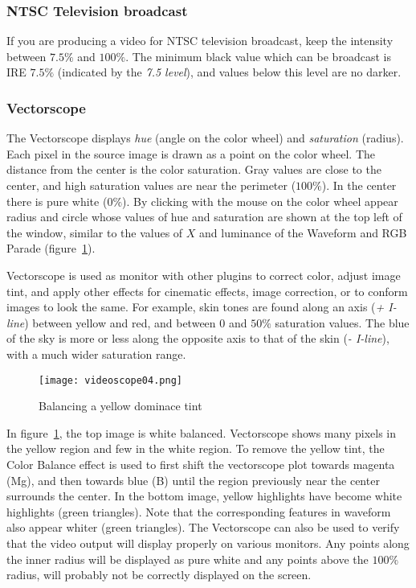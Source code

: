 \subsubsection*{NTSC Television broadcast}%
\label{ssub:ntsc_television_broadcast}

If you are producing a video for NTSC television broadcast, keep the intensity between $7.5\%$ and $100\%$. The minimum black value which can be broadcast is IRE $7.5\%$ (indicated by the \textit{7.5 level}), and values below this level are no darker.

\subsubsection*{Vectorscope}%
\label{ssub:Vectorscope}

The Vectorscope displays \textit{hue} (angle on the color wheel) and \textit{saturation} (radius). Each pixel in the source image is drawn as a point on the color wheel. The distance from the center is the color saturation. Gray values are close to the center, and high saturation values are near the perimeter ($100\%$). In the center there is pure white ($0\%$). By clicking with the mouse on the color wheel appear radius and circle whose values of hue and saturation are shown at the top left of the window, similar to the values of $X$ and luminance of the Waveform and RGB Parade (figure~\ref{fig:videoscope04}).

Vectorscope is used as monitor with other plugins to correct color, adjust image tint, and apply other effects for cinematic effects, image correction, or to conform images to look the same. For example, skin tones are found along an axis (\textit{+ I-line}) between yellow and red, and between $0$ and $50\%$ saturation values. The blue of the sky is more or less along the opposite axis to that of the skin (\textit{- I-line}), with a much wider saturation range.

\begin{figure}[hbtp]
    \centering
    \texttt{[image: videoscope04.png]}
    \caption{Balancing a yellow dominace tint}
    \label{fig:videoscope04}
\end{figure}

In figure~\ref{fig:videoscope04}, the top image is white balanced. Vectorscope shows many pixels in the yellow region and few in the white region. To remove the yellow tint, the Color Balance effect is used to first shift the vectorscope plot towards magenta (Mg), and then towards blue (B) until the region previously near the center surrounds the center. In the bottom image, yellow highlights have become white highlights (green triangles). Note that the corresponding features in waveform also appear whiter (green triangles).
The Vectorscope can also be used to verify that the video output will display properly on various monitors. Any points along the inner radius will be displayed as pure white and any points above the $100\%$ radius, will probably not be correctly displayed on the screen.

